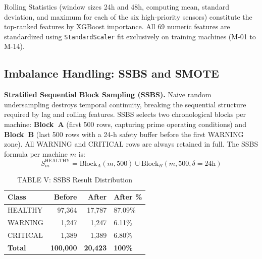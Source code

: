 \documentclass[conference]{IEEEtran}
\begin{document}
Rolling Statistics (window sizes 24h and 48h, computing mean, standard
deviation, and maximum for each of the six high-priority sensors) constitute
the top-ranked features by XGBoost importance. All 69 numeric features are
standardized using \texttt{StandardScaler} fit exclusively on training
machines (M-01 to M-14).

\subsection{Imbalance Handling: SSBS and SMOTE}

\textbf{Stratified Sequential Block Sampling (SSBS).}
Naive random undersampling destroys temporal continuity, breaking the
sequential structure required by lag and rolling features. SSBS selects two
chronological blocks per machine: \textbf{Block~A} (first 500 rows, capturing
prime operating conditions) and \textbf{Block~B} (last 500 rows with a 24-h
safety buffer before the first WARNING zone). All WARNING and CRITICAL rows
are always retained in full. The SSBS formula per machine $m$ is:
\begin{equation}
S_m^{\text{HEALTHY}} = \text{Block}_A(m,500) \cup \text{Block}_B(m,500,\delta=24\text{h})
\label{eq:ssbs}
\end{equation}


\begin{table}[htbp]
\caption{TABLE V: SSBS Result Distribution}
\centering
\begin{tabular}{lrrl}
\hline
\textbf{Class} & \textbf{Before} & \textbf{After} & \textbf{After \%} \\
\hline
HEALTHY  & 97,364 & 17,787 & 87.09\% \\
WARNING  &  1,247 &  1,247 &  6.11\% \\
CRITICAL &  1,389 &  1,389 &  6.80\% \\
\hline
\textbf{Total} & \textbf{100,000} & \textbf{20,423} & \textbf{100\%} \\
\hline
\end{tabular}
\label{tab:ssbs}
\end{table}
\end{document}
